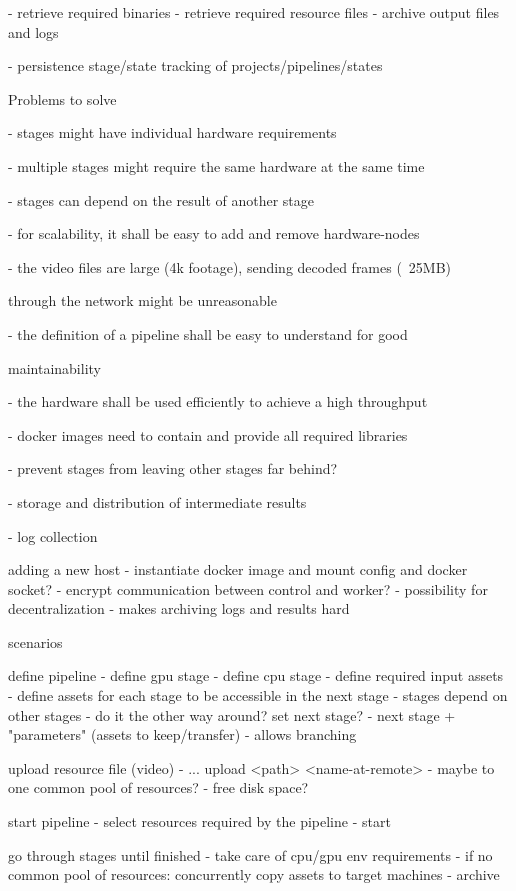 - retrieve required binaries
- retrieve required resource files
- archive output files and logs

- persistence stage/state tracking of projects/pipelines/states

Problems to solve



- stages might have individual hardware requirements

- multiple stages might require the same hardware at the same time

- stages can depend on the result of another stage

- for scalability, it shall be easy to add and remove hardware-nodes

- the video files are large (4k footage), sending decoded frames (~25MB)

through the network might be unreasonable

- the definition of a pipeline shall be easy to understand for good

maintainability

- the hardware shall be used efficiently to achieve a high throughput

- docker images need to contain and provide all required libraries

- prevent stages from leaving other stages far behind?

- storage and distribution of intermediate results

- log collection




adding a new host
- instantiate docker image and mount config and docker socket?
- encrypt communication between control and worker?
- possibility for decentralization
- makes archiving logs and results hard


scenarios

define pipeline
- define gpu stage
- define cpu stage
- define required input assets
- define assets for each stage to be accessible in the next stage
- stages depend on other stages
- do it the other way around? set next stage?
- next stage + "parameters" (assets to keep/transfer)
- allows branching

upload resource file (video)
- ... upload <path> <name-at-remote>
- maybe to one common pool of resources?
- free disk space?

start pipeline
- select resources required by the pipeline
- start

go through stages until finished
- take care of cpu/gpu env requirements
- if no common pool of resources: concurrently copy assets to target machines
- archive 

